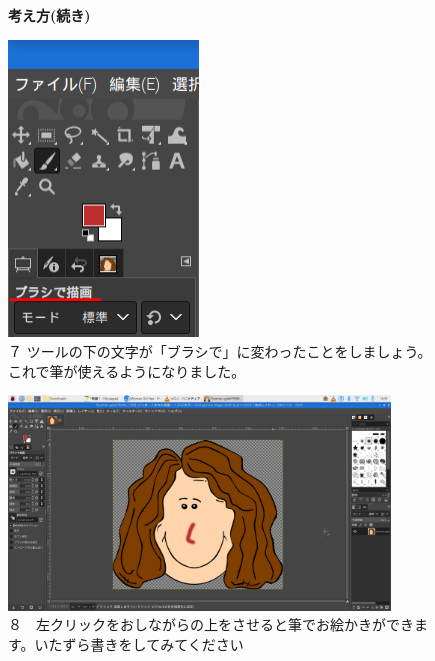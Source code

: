 \documentclass[a4paper,12pt]{jarticle}
\begin{document}
\begin{figure}[ht]
  \textbf{考え方(続き)}

  \begin{minipage}{\textwidth}
    \centering
    \begin{minipage}{5.76cm}
      \includegraphics[width=5.05cm]{textbook-img130.png}\\
      ７
      ツールの下の文字が「ブラシで」に変わったことをしましょう。これで筆が使えるようになりました。
    \end{minipage}
    \hfill
    \begin{minipage}{10.2cm}
      \includegraphics[width=10.134cm]{textbook-img131.png}\\
      ８　左クリックをおしながらの上をさせると筆でお絵かきができます。いたずら書きをしてみてください
    \end{minipage}
  \end{minipage}


  \bigskip


\end{figure}
\end{document}

